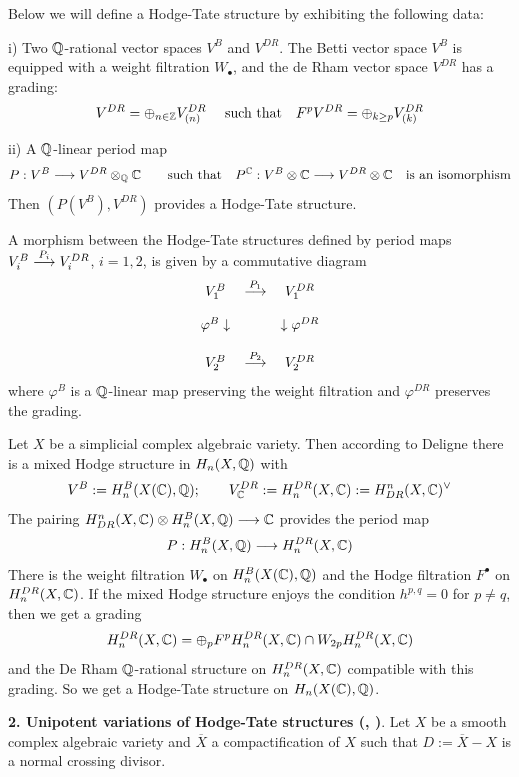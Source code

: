 \documentclass[10pt]{article}
\begin{document}
Below we will define a Hodge-Tate  structure by exhibiting 
the following data: 

i) Two ${\mathbb Q}$-rational vector spaces $V^B$ and $V^{DR}$. The Betti vector space $V^B$ 
is equipped with a weight filtration $W_{\bullet}$, 
and the de Rham vector space $V^{DR}$ has a 
grading:
\begin{equation} \label{1.1.01.5}
V^{DR} = \oplus_{n \in {\mathbb Z}} V^{DR}_{(n)}
\quad \mbox{ such that} \quad F^pV^{DR} = \oplus_{k \geq p}V^{DR}_{(k)}
\end{equation}  

ii) A ${\mathbb Q}$-linear period map 
$$
P: V^B \longrightarrow V^{DR}\otimes_{{\mathbb Q}}{\mathbb C} \qquad \mbox{such that} \quad  P^{{\mathbb C}}: 
V^B\otimes {\mathbb C} \longrightarrow V^{DR}\otimes {\mathbb C} \quad \mbox{is an isomorphism}
$$
Then  $(P(V^B), V^{DR})$ provides a Hodge-Tate structure. 

A morphism between the  Hodge-Tate structures defined by period maps 
$V_i^B  \stackrel{P_i}{\longrightarrow} V_i^{DR}$, $i=1,2$, is given by  a commutative diagram
$$
\begin{array}{ccc}
V_1^B & \stackrel{P_1}{\longrightarrow}& V_1^{DR}\\
&&\\
\varphi^B\downarrow && \downarrow \varphi^{DR}\\
&&\\
V_2^B & \stackrel{P_2}{\longrightarrow}& V_2^{DR}
\end{array}
$$
where $\varphi^B$ is a ${\mathbb Q}$-linear map preserving the weight filtration and 
$\varphi^{DR}$ 
preserves the grading. 


Let $X$ be a simplicial complex algebraic variety. Then according to Deligne \cite{D4}
there is a mixed Hodge structure in $H_n(X, {\mathbb Q})$ with   
$$
V^B:= H_n^B(X({\mathbb C}), {\mathbb Q}); \qquad 
V_{{\mathbb C}}^{DR}:= H_n^{DR}(X, {\mathbb C}):= H^n_{DR}(X, {\mathbb C})^{\vee}
$$
 The pairing  $H^n_{DR}(X, {\mathbb C}) \otimes H_n^B(X, {\mathbb Q}) \longrightarrow {\mathbb C}$ provides the  period map   
$$
P: H_n^B(X, {\mathbb Q}) \longrightarrow H_n^{DR}(X, {\mathbb C})
$$
 There is the weight filtration $W_{\bullet}$ on $H_n^B(X({\mathbb C}), {\mathbb Q})$ and the 
Hodge filtration $F^{\bullet}$ on $H_n^{DR}(X, {\mathbb C})$. If the mixed Hodge structure enjoys
the condition  $h^{p,q} =0$ for $p \not =q$, 
 then we get a grading 
$$
H_n^{DR}(X, {\mathbb C}) = \oplus_p F^pH_n^{DR}(X, {\mathbb C}) \cap W_{2p}H_n^{DR}(X, {\mathbb C})
$$ 
and   the De Rham ${\mathbb Q}$-rational structure on $H_n^{DR}(X, {\mathbb C})$ compatible with this grading. 
So we get a Hodge-Tate  structure on $H_n(X({\mathbb C}), {\mathbb Q})$. 

{\bf 2. Unipotent variations of Hodge-Tate structures (\cite{HZ}, \cite{H})}. 
Let $X$ be a smooth complex algebraic variety and $\overline X$ a 
compactification of $X$ such that $D:= \overline X 
- X$ is a normal crossing divisor. 
\end{document}
